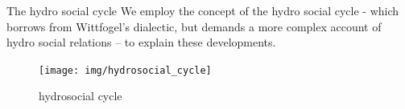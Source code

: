 \documentclass[newPxFont]{beamer}
\begin{document}

\begin{frame}[c]{The hydro social cycle}
	\vspace{-2em}
	We employ the concept of the hydro social cycle  - which borrows from Wittfogel's dialectic, but demands a more complex account of hydro social relations -- to explain these developments.
	\begin{figure}
	\vspace{-1em}
	\centering
	\texttt{[image: img/hydrosocial\_cycle]}
	 \caption{hydrosocial cycle}
\end{figure}

\end{frame}

%
%
%
\end{document}
